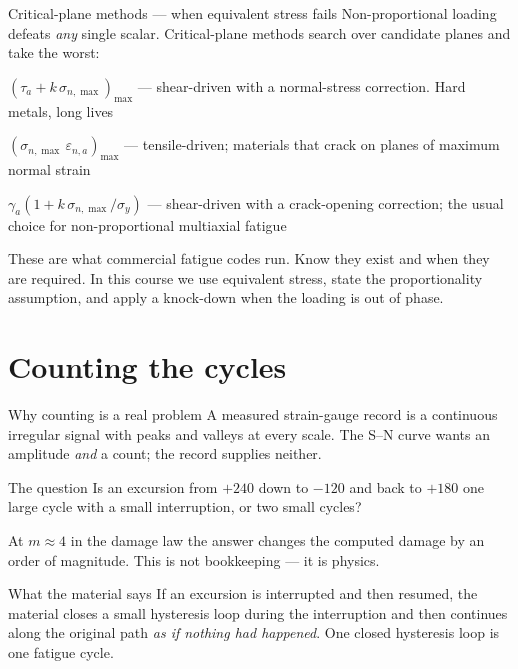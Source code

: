 \documentclass[aspectratio=169,10pt]{beamer}
\begin{document}
\begin{frame}{Critical-plane methods --- when equivalent stress fails}
Non-proportional loading defeats \emph{any} single scalar. Critical-plane methods search over candidate planes and take the worst:
\vspace{2pt}
\begin{description}\footnotesize
  \item[Findley] $\left(\tau_a+k\,\sigma_{n,\max}\right)_{\max}$ --- shear-driven with a normal-stress correction. Hard metals, long lives
  \item[Smith--Watson--Topper] $\left(\sigma_{n,\max}\,\varepsilon_{n,a}\right)_{\max}$ --- tensile-driven; materials that crack on planes of maximum normal strain
  \item[Fatemi--Socie] $\gamma_a\left(1+k\,\sigma_{n,\max}/\sigma_y\right)$ --- shear-driven with a crack-opening correction; the usual choice for non-proportional multiaxial fatigue
\end{description}
\vspace{4pt}
\begin{block}{}
These are what commercial fatigue codes run. \alert{Know they exist and when they are required.} In this course we use equivalent stress, state the proportionality assumption, and apply a knock-down when the loading is out of phase.
\end{block}
\end{frame}

\section{Counting the cycles}

\begin{frame}{Why counting is a real problem}
A measured strain-gauge record is a continuous irregular signal with peaks and valleys at every scale. The S--N curve wants an amplitude \emph{and} a count; the record supplies neither.
\vspace{4pt}
\begin{alertblock}{The question}
Is an excursion from $+240$ down to $-120$ and back to $+180$ \alert{one large cycle with a small interruption}, or \alert{two small cycles}?
\end{alertblock}
\vspace{2pt}
At $m\approx4$ in the damage law the answer changes the computed damage by an order of magnitude. This is not bookkeeping --- it is physics.
\vspace{4pt}
\begin{block}{What the material says}
\footnotesize If an excursion is interrupted and then resumed, the material closes a small hysteresis loop during the interruption and then continues along the original path \emph{as if nothing had happened}. \alert{One closed hysteresis loop is one fatigue cycle.}
\end{block}
\end{frame}
\end{document}
